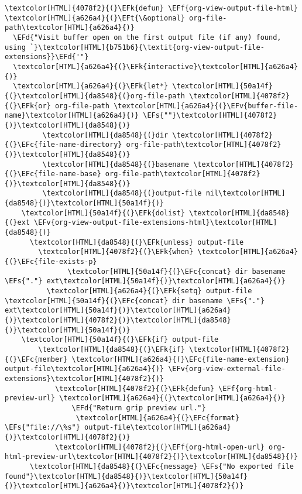 \documentclass{scrartcl}
\newcommand{\EFk}[1]{\textcolor{EFk}{#1}} %
\newcommand{\EFd}[1]{\textcolor{EFd}{\textit{#1}}} %
\newcommand{\EFt}[1]{\textcolor{EFt}{#1}} %
\newcommand{\EFs}[1]{\textcolor{EFs}{#1}} %
\newcommand{\EFc}[1]{\textcolor{EFc}{#1}} %
\newcommand{\EFv}[1]{\textcolor{EFv}{#1}} %
\newcommand{\EFf}[1]{\textcolor{EFf}{#1}} %
\begin{document}
\begin{Code}
\begin{Verbatim}[]
\textcolor[HTML]{4078f2}{(}\EFk{defun} \EFf{org-view-output-file-html} \textcolor[HTML]{a626a4}{(}\EFt{\&optional} org-file-path\textcolor[HTML]{a626a4}{)}
  \EFd{"Visit buffer open on the first output file (if any) found, using `}\textcolor[HTML]{b751b6}{\textit{org-view-output-file-extensions}}\EFd{'"}
  \textcolor[HTML]{a626a4}{(}\EFk{interactive}\textcolor[HTML]{a626a4}{)}
  \textcolor[HTML]{a626a4}{(}\EFk{let*} \textcolor[HTML]{50a14f}{(}\textcolor[HTML]{da8548}{(}org-file-path \textcolor[HTML]{4078f2}{(}\EFk{or} org-file-path \textcolor[HTML]{a626a4}{(}\EFv{buffer-file-name}\textcolor[HTML]{a626a4}{)} \EFs{""}\textcolor[HTML]{4078f2}{)}\textcolor[HTML]{da8548}{)}
         \textcolor[HTML]{da8548}{(}dir \textcolor[HTML]{4078f2}{(}\EFc{file-name-directory} org-file-path\textcolor[HTML]{4078f2}{)}\textcolor[HTML]{da8548}{)}
         \textcolor[HTML]{da8548}{(}basename \textcolor[HTML]{4078f2}{(}\EFc{file-name-base} org-file-path\textcolor[HTML]{4078f2}{)}\textcolor[HTML]{da8548}{)}
         \textcolor[HTML]{da8548}{(}output-file nil\textcolor[HTML]{da8548}{)}\textcolor[HTML]{50a14f}{)}
    \textcolor[HTML]{50a14f}{(}\EFk{dolist} \textcolor[HTML]{da8548}{(}ext \EFv{org-view-output-file-extensions-html}\textcolor[HTML]{da8548}{)}
      \textcolor[HTML]{da8548}{(}\EFk{unless} output-file
        \textcolor[HTML]{4078f2}{(}\EFk{when} \textcolor[HTML]{a626a4}{(}\EFc{file-exists-p}
               \textcolor[HTML]{50a14f}{(}\EFc{concat} dir basename \EFs{"."} ext\textcolor[HTML]{50a14f}{)}\textcolor[HTML]{a626a4}{)}
          \textcolor[HTML]{a626a4}{(}\EFk{setq} output-file \textcolor[HTML]{50a14f}{(}\EFc{concat} dir basename \EFs{"."} ext\textcolor[HTML]{50a14f}{)}\textcolor[HTML]{a626a4}{)}\textcolor[HTML]{4078f2}{)}\textcolor[HTML]{da8548}{)}\textcolor[HTML]{50a14f}{)}
    \textcolor[HTML]{50a14f}{(}\EFk{if} output-file
        \textcolor[HTML]{da8548}{(}\EFk{if} \textcolor[HTML]{4078f2}{(}\EFc{member} \textcolor[HTML]{a626a4}{(}\EFc{file-name-extension} output-file\textcolor[HTML]{a626a4}{)} \EFv{org-view-external-file-extensions}\textcolor[HTML]{4078f2}{)}
            \textcolor[HTML]{4078f2}{(}\EFk{defun} \EFf{org-html-preview-url} \textcolor[HTML]{a626a4}{(}\textcolor[HTML]{a626a4}{)}
                \EFd{"Return grip preview url."}
                 \textcolor[HTML]{a626a4}{(}\EFc{format} \EFs{"file://\%s"} output-file\textcolor[HTML]{a626a4}{)}\textcolor[HTML]{4078f2}{)}
            \textcolor[HTML]{4078f2}{(}\EFf{org-html-open-url} org-html-preview-url\textcolor[HTML]{4078f2}{)}\textcolor[HTML]{da8548}{)}
      \textcolor[HTML]{da8548}{(}\EFc{message} \EFs{"No exported file found"}\textcolor[HTML]{da8548}{)}\textcolor[HTML]{50a14f}{)}\textcolor[HTML]{a626a4}{)}\textcolor[HTML]{4078f2}{)}


\end{Verbatim}
\end{Code}
\end{document}

